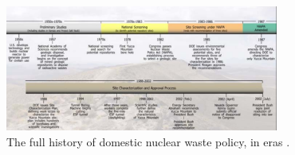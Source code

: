 \begin{figure}[htbp!]
  \begin{center}
    \includegraphics[width=0.8\textwidth]{timeline.eps}
  \end{center}
  \caption{The full history of domestic nuclear waste policy, in eras 
    \cite{peters_whats_2013}.}
  \label{fig:timeline}
\end{figure}

